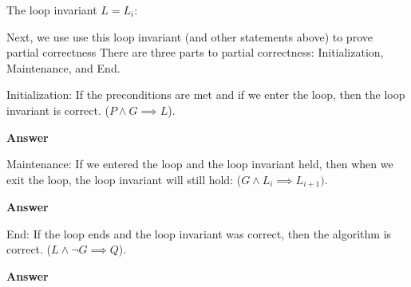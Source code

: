 \documentclass{article}
\begin{document}
The loop invariant $L=L_i$:
\vspace{0.5in}


\pagebreak
Next, we use use this loop invariant (and other statements above)
to prove partial correctness There are three parts to partial
correctness: Initialization, Maintenance, and End.

Initialization: If the preconditions are met and if we enter the loop, then the
loop invariant is correct. ($P \wedge G \implies L$).

\textbf{Answer}
\vspace{1in}


Maintenance: If we entered the loop and the loop invariant held, then when we
exit the loop, the loop invariant will still hold: ($G \wedge L_i \implies
L_{i+1})$.

\textbf{Answer}
\vspace{1in}


End: If the loop ends and the loop invariant was correct, then the algorithm is
correct. ($L \wedge \neg G \implies Q$).

\textbf{Answer}
\vspace{1in}
\end{document}
